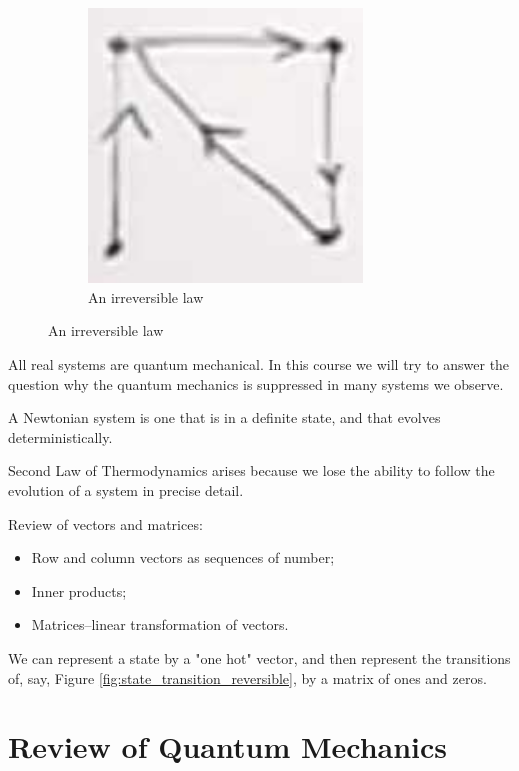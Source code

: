 \documentclass[]{article}
\begin{document}
\begin{figure}[H]
\begin{subfigure}[t]{0.45\textwidth}
	\end{subfigure}
	\begin{subfigure}[t]{0.45\textwidth}
		\caption{An irreversible law}
		\includegraphics[width=0.8\textwidth]{et-1-2}
	\end{subfigure}
\end{figure}

All real systems are quantum mechanical. In this course we will try to answer the question why the quantum mechanics is suppressed in many systems we observe.

A Newtonian system is one that is in a definite state, and that evolves deterministically.

Second Law of Thermodynamics arises because we lose the ability to follow the evolution of a system in precise detail.

Review of vectors and matrices:
\begin{itemize}
	\item Row and column vectors as sequences of number;
	\item Inner products;
	\item Matrices--linear transformation of vectors.
\end{itemize}

We can represent a state by a "one hot" vector, and then represent the transitions of, say, Figure \ref{fig:state_transition_reversible}, by a matrix of ones and zeros.

\section{Review of Quantum Mechanics}
\end{document}

